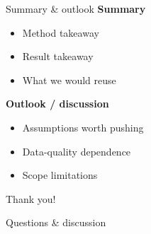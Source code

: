 
\begin{frame}{Summary \& outlook}
  \textbf{Summary}
  \begin{itemize}
    \item Method takeaway
    \item Result takeaway
    \item What we would reuse
  \end{itemize}
  \vspace{0.5em}
  \textbf{Outlook / discussion}
  \begin{itemize}
    \item Assumptions worth pushing
    \item Data-quality dependence
    \item Scope limitations
  \end{itemize}
  \vfill
  \centering
  {\Large Thank you!\par}
  {\normalsize Questions \& discussion\par}
\end{frame}

